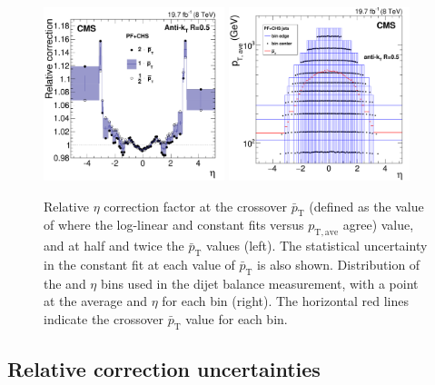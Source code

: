 \documentclass[11pt,twoside,a4paper,cmspaper,final,collab]{cms-tdr}
\begin{document}
\begin{figure}[htbp!]
\centering
\includegraphics[width=0.47\textwidth]{Figure_017-a.pdf}
\includegraphics[width=0.47\textwidth]{Figure_017-b.pdf}
\caption{\label{fig:l2res}
Relative $\eta$ correction factor at the crossover $\bar{p}_\mathrm{T}$ (defined as the value of \pt where the log-linear and constant fits versus $p_\mathrm{T, ave}$ agree) value, and at half and twice the $\bar{p}_\mathrm{T}$ values (left).  The statistical uncertainty in the constant fit at each value of $\bar{p}_\mathrm{T}$ is also shown.
Distribution of the \pt and $\eta$ bins used in the dijet balance measurement, with a point at the average \pt and $\eta$ for each bin (right). The horizontal red lines indicate the crossover $\bar{p}_\mathrm{T}$ value for each bin.
}
\end{figure}

\subsection{Relative correction uncertainties}\label{sec:time}
\end{document}
